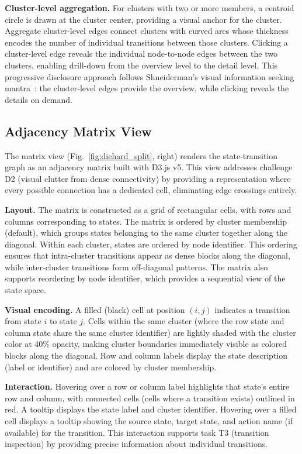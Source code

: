 \documentclass[conference]{IEEEtran}
\begin{document}
\textbf{Cluster-level aggregation.} For clusters with two or more members, a centroid circle is drawn at the cluster center, providing a visual anchor for the cluster. Aggregate cluster-level edges connect clusters with curved arcs whose thickness encodes the number of individual transitions between those clusters. Clicking a cluster-level edge reveals the individual node-to-node edges between the two clusters, enabling drill-down from the overview level to the detail level. This progressive disclosure approach follows Shneiderman's visual information seeking mantra~\cite{shneiderman1996eyes}: the cluster-level edges provide the overview, while clicking reveals the details on demand.

\subsection{Adjacency Matrix View}

The matrix view (Fig.~\ref{fig:diehard_split}, right) renders the state-transition graph as an adjacency matrix built with D3.js v5. This view addresses challenge D2 (visual clutter from dense connectivity) by providing a representation where every possible connection has a dedicated cell, eliminating edge crossings entirely.

\textbf{Layout.} The matrix is constructed as a grid of rectangular cells, with rows and columns corresponding to states. The matrix is ordered by cluster membership (default), which groups states belonging to the same cluster together along the diagonal. Within each cluster, states are ordered by node identifier. This ordering ensures that intra-cluster transitions appear as dense blocks along the diagonal, while inter-cluster transitions form off-diagonal patterns. The matrix also supports reordering by node identifier, which provides a sequential view of the state space.

\textbf{Visual encoding.} A filled (black) cell at position $(i, j)$ indicates a transition from state $i$ to state $j$. Cells within the same cluster (where the row state and column state share the same cluster identifier) are lightly shaded with the cluster color at 40\% opacity, making cluster boundaries immediately visible as colored blocks along the diagonal. Row and column labels display the state description (label or identifier) and are colored by cluster membership.

\textbf{Interaction.} Hovering over a row or column label highlights that state's entire row and column, with connected cells (cells where a transition exists) outlined in red. A tooltip displays the state label and cluster identifier. Hovering over a filled cell displays a tooltip showing the source state, target state, and action name (if available) for the transition. This interaction supports task T3 (transition inspection) by providing precise information about individual transitions.
\end{document}
